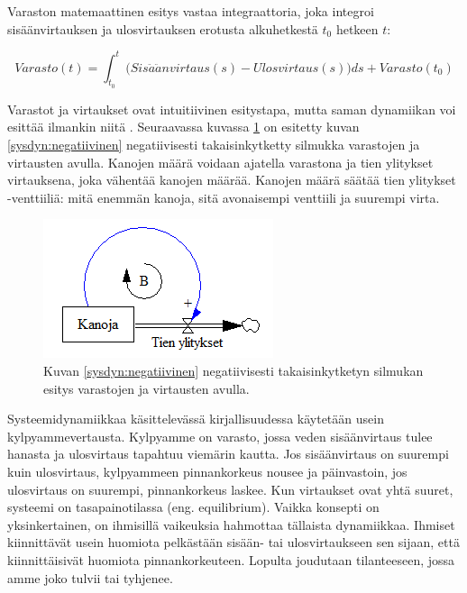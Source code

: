 \documentclass[finnish,12pt,a4paper,pdftex]{article}
\begin{document}
\begin{onehalfspacing}
Varaston matemaattinen esitys vastaa integraattoria, joka integroi sisäänvirtauksen ja ulosvirtauksen erotusta alkuhetkestä $t_0$ hetkeen $t$: 

\begin{equation}
  Varasto(t) = \int_{t_0}^t \Big( Sis\ddot{a}\ddot{a}nvirtaus(s) - Ulosvirtaus(s) \Big) ds + Varasto(t_0)
\end{equation} \cite[s. 194--195]{Sterman2000} 

Varastot ja virtaukset ovat intuitiivinen esitystapa, mutta saman dynamiikan voi esittää ilmankin niitä \cite[s. 191--230]{Sterman2000}. Seuraavassa kuvassa \ref{sysdyn:varastovirtauskana} on esitetty kuvan \ref{sysdyn:negatiivinen} negatiivisesti takaisinkytketty silmukka varastojen ja virtausten avulla. Kanojen määrä voidaan ajatella varastona ja tien ylitykset virtauksena, joka vähentää kanojen määrää. Kanojen määrä säätää tien ylitykset -venttiiliä: mitä enemmän kanoja, sitä avonaisempi venttiili ja suurempi virta. 

\begin{figure}[H]
\centering \includegraphics{varastovirtauskana}
\caption{Kuvan \ref{sysdyn:negatiivinen} negatiivisesti takaisinkytketyn silmukan esitys varastojen ja virtausten avulla. \label{sysdyn:varastovirtauskana}}
\end{figure}

Systeemidynamiikkaa käsittelevässä kirjallisuudessa käytetään usein kylpyammevertausta. Kylpyamme on varasto, jossa veden sisäänvirtaus tulee hanasta ja ulosvirtaus tapahtuu viemärin kautta. Jos sisäänvirtaus on suurempi kuin ulosvirtaus, kylpyammeen pinnankorkeus nousee ja päinvastoin, jos ulosvirtaus on suurempi, pinnankorkeus laskee. Kun virtaukset ovat yhtä suuret, systeemi on tasapainotilassa (eng. equilibrium). Vaikka konsepti on yksinkertainen, on ihmisillä vaikeuksia hahmottaa tällaista dynamiikkaa. Ihmiset kiinnittävät usein huomiota pelkästään sisään- tai ulosvirtaukseen sen sijaan, että kiinnittäisivät huomiota pinnankorkeuteen. Lopulta joudutaan tilanteeseen, jossa amme joko tulvii tai tyhjenee. \cite{Sweeney2000}


\end{onehalfspacing}
\end{document}
